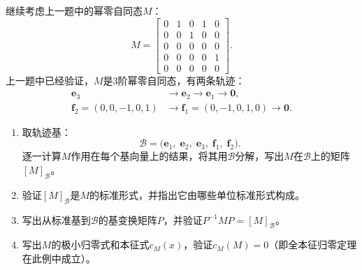 \documentclass[12pt,UTF8]{ctexbook}
\begin{document}
\begin{et}\label{et:6_canonical}
继续考虑上一题中的幂零自同态$M$：
$$
M = \begin{bmatrix}
0 & 1 & 0 & 1 & 0 \\
0 & 0 & 1 & 0 & 0 \\
0 & 0 & 0 & 0 & 0 \\
0 & 0 & 0 & 0 & 1 \\
0 & 0 & 0 & 0 & 0
\end{bmatrix}.
$$
上一题中已经验证，$M$是$3$阶幂零自同态，有两条轨迹：
\begin{align*}
    \mathbf{e}_3 &\longrightarrow \mathbf{e}_2 \longrightarrow \mathbf{e}_1 \longrightarrow \mathbf{0},\\
    \mathbf{f}_2 = (0,0,-1,0,1) &\longrightarrow \mathbf{f}_1 = (0,-1,0,1,0) \longrightarrow \mathbf{0}.
\end{align*}
\begin{enumerate}
\item 取轨迹基：
$$\mathcal{B} = \big(\mathbf{e}_1,\; \mathbf{e}_2,\; \mathbf{e}_3,\; \mathbf{f}_1,\; \mathbf{f}_2\big).$$
逐一计算$M$作用在每个基向量上的结果，将其用$\mathcal{B}$分解，写出$M$在$\mathcal{B}$上的矩阵$[M]_{\mathcal{B}}$。
\item 验证$[M]_{\mathcal{B}}$是$M$的标准形式，并指出它由哪些单位标准形式构成。
\item 写出从标准基到$\mathcal{B}$的基变换矩阵$P$，并验证$P^{-1}MP = [M]_{\mathcal{B}}$。
\item 写出$M$的极小归零式和本征式$c_M(x)$，验证$c_M(M) = 0$（即全本征归零定理在此例中成立）。
\end{enumerate}
\end{et}
\end{document}
